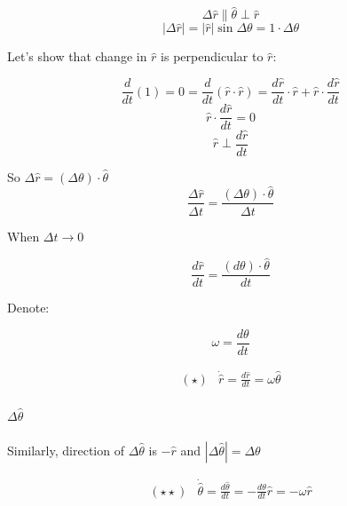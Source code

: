 $$\Delta \hat{r}  \parallel \hat{\theta} \perp \hat{r} $$
$$| \Delta \hat{r} | = | \hat{r} | \sin{\Delta \theta} = 1 \cdot \Delta \theta$$


Let's show that change in $\hat{r}$ is perpendicular to $\hat{r}$:

$$\frac{d}{dt}(1) = 0 = \frac{d}{dt}(\hat{r}\cdot\hat{r}) = \frac{d\hat{r}}{dt} \cdot \hat{r}+ \hat{r} \cdot \frac{d\hat{r}}{dt}$$
$$\hat{r} \cdot \frac{d\hat{r}}{dt} = 0$$
$$\hat{r} \perp \frac{d\hat{r}}{dt}$$

So $\Delta \hat{r} = (\Delta \theta) \cdot \hat{\theta}$
$$\frac{\Delta \hat{r}}{\Delta t} = \frac{(\Delta \theta) \cdot \hat{\theta}}{\Delta t}$$

When $\Delta t \to 0$

$$\frac{d \hat{r}}{d t} = \frac{(d \theta) \cdot \hat{\theta}}{d t}$$

Denote:

$$\omega = \frac{d \theta}{dt} $$

\begin{align*}
\left(\star\right) & \dot{\hat{r}} = \frac{d\hat{r}}{dt} = \omega \hat{\theta}
\end{align*}

\paragraph{$\Delta \hat{\theta}$} Similarly, direction of $\Delta \hat{\theta}$ is $-\hat{r}$ and $| \Delta \hat{\theta} | = \Delta\theta$

\begin{align*}
(\star\star) & \dot{\hat{\theta}} = \frac{d \hat{\theta}}{d t} = - \frac{d \theta}{dt} \hat{r}  = - \omega \hat{r}
\end{align*}